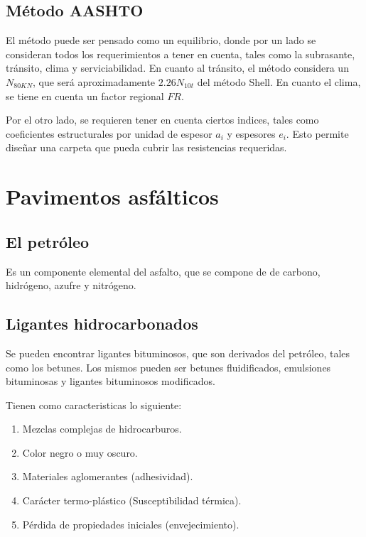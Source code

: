 \documentclass[../main.tex]{subfiles}
\begin{document}
\subsection{Método AASHTO}

El método puede ser pensado como un equilibrio, donde por un lado se consideran
todos los requerimientos a tener en cuenta, tales como la subrasante, tránsito,
clima y serviciabilidad. En cuanto al tránsito, el método considera un
$N_{80KN}$, que será aproximadamente $2.26 N_{10t}$ del método Shell. En
cuanto el clima, se tiene en cuenta un factor regional $FR$.

Por el otro lado, se requieren tener en cuenta ciertos indices, tales como
coeficientes estructurales por unidad de espesor $a_i$ y espesores $e_i$. Esto
permite diseñar una carpeta que pueda cubrir las resistencias requeridas.

\section{Pavimentos asfálticos}

\subsection{El petróleo}

Es un componente elemental del asfalto, que se compone de de carbono, hidrógeno,
azufre y nitrógeno.

\subsection{Ligantes hidrocarbonados}

Se pueden encontrar ligantes bituminosos, que son derivados del petróleo, tales
como los betunes. Los mismos pueden ser betunes fluidificados, emulsiones
bituminosas y ligantes bituminosos modificados.

Tienen como caracteristicas lo siguiente:

\begin{enumerate}
  \item Mezclas complejas de hidrocarburos.
  \item Color negro o muy oscuro.
  \item Materiales aglomerantes (adhesividad).
  \item Carácter termo-plástico (Susceptibilidad térmica).
  \item Pérdida de propiedades iniciales (envejecimiento).
\end{enumerate}
\end{document}
